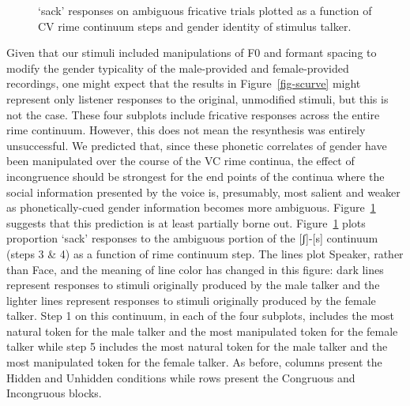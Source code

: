 \documentclass[
  letterpaper,
  DIV=11,
  numbers=noendperiod]{scrartcl}
\begin{document}
\begin{figure}


\caption{\label{fig-rimes}`sack' responses on ambiguous fricative trials
plotted as a function of CV rime continuum steps and gender identity of
stimulus talker.}

\end{figure}%

Given that our stimuli included manipulations of F0 and formant spacing
to modify the gender typicality of the male-provided and female-provided
recordings, one might expect that the results in Figure~\ref{fig-scurve}
might represent only listener responses to the original, unmodified
stimuli, but this is not the case. These four subplots include fricative
responses across the entire rime continuum. However, this does not mean
the resynthesis was entirely unsuccessful. We predicted that, since
these phonetic correlates of gender have been manipulated over the
course of the VC rime continua, the effect of incongruence should be
strongest for the end points of the continua where the social
information presented by the voice is, presumably, most salient and
weaker as phonetically-cued gender information becomes more ambiguous.
Figure~\ref{fig-rimes} suggests that this prediction is at least
partially borne out. Figure~\ref{fig-rimes} plots proportion `sack'
responses to the ambiguous portion of the {[}ʃ{]}-{[}s{]} continuum
(steps 3 \& 4) as a function of rime continuum step. The lines plot
Speaker, rather than Face, and the meaning of line color has changed in
this figure: dark lines represent responses to stimuli originally
produced by the male talker and the lighter lines represent responses to
stimuli originally produced by the female talker. Step 1 on this
continuum, in each of the four subplots, includes the most natural token
for the male talker and the most manipulated token for the female talker
while step 5 includes the most natural token for the male talker and the
most manipulated token for the female talker. As before, columns present
the Hidden and Unhidden conditions while rows present the Congruous and
Incongruous blocks.
\end{document}
